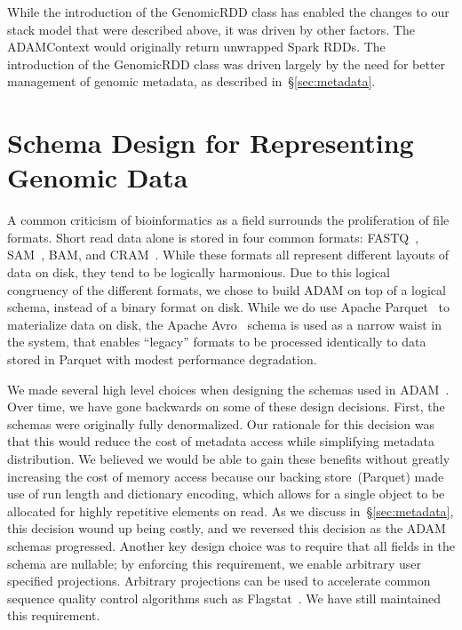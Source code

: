\documentclass[phd]{ucbthesis}
\begin{document}
While the introduction of the {GenomicRDD} class has enabled the changes
to our stack model that were described above, it was driven by other factors.
The {ADAMContext} would originally return unwrapped {Spark} RDDs.
The introduction of the {GenomicRDD} class was driven largely by the need
for better management of genomic metadata, as described in~\S\ref{sec:metadata}.

\section{Schema Design for Representing Genomic Data}
\label{sec:schema-design}

A common criticism of bioinformatics as a field surrounds the proliferation of file formats. Short read data alone is
stored in four common formats: {FASTQ}~\cite{cock10}, {SAM}~\cite{li09}, {BAM}, and
{CRAM}~\cite{fritz11}. While these formats all represent different layouts of data on disk, they tend to be
logically harmonious. Due to this logical congruency of the different formats, we chose to build {ADAM}
on top of a logical schema, instead of a binary format on disk. While we do use Apache {Parquet}~\cite{parquet} to
materialize data on disk, the Apache {Avro}~\cite{avro} schema is used as a narrow waist in the system,
that enables ``legacy'' formats to be processed identically to data stored in {Parquet} with modest performance
degradation.

We made several high level choices when designing the schemas used in
{ADAM}~\cite{massie13}. Over time, we have gone backwards on some of
these design decisions. First, the schemas were originally fully denormalized.
Our rationale for this decision was that this would reduce the cost of metadata
access while simplifying metadata distribution. We believed we would be able to
gain these benefits without greatly increasing the cost of memory access because
our backing store~({Parquet}) made use of run length and dictionary
encoding, which allows for a single object to be allocated for highly repetitive
elements on read. As we discuss in~\S\ref{sec:metadata}, this decision wound up
being costly, and we reversed this decision as the {ADAM} schemas
progressed. Another key design choice was to require that all fields in the
schema are nullable; by enforcing this requirement, we enable arbitrary user
specified projections. Arbitrary projections can be used to accelerate
common sequence quality control algorithms such as Flagstat~\cite{massie13,
  nothaft15}. We have still maintained this requirement.
\end{document}
